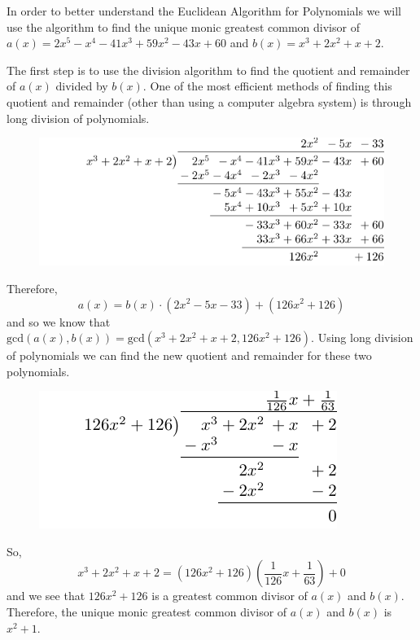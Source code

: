 \documentclass[
]{book}
\theoremstyle{definition}
\theoremstyle{definition}
\theoremstyle{definition}
\theoremstyle{remark}
\begin{document}
In order to better understand the Euclidean Algorithm for Polynomials we will use the algorithm to find the unique monic greatest common divisor of \(a(x)=2x^5-x^4-41x^3+59x^2-43x+60\) and \(b(x)=x^3+2x^2+x+2\).

The first step is to use the division algorithm to find the quotient and remainder of \(a(x)\) divided by \(b(x)\). One of the most efficient methods of finding this quotient and remainder (other than using a computer algebra system) is through long division of polynomials.

\begin{figure}

{\centering \includegraphics[width=0.75\linewidth]{tikz/polynomial-division} 

}

\end{figure}

Therefore,
\[a(x)=b(x) \cdot (2x^2-5x-33) + (126x^2 + 126)\] and so we know that \(\mathrm{gcd}(a(x),b(x))= \mathrm{gcd}(x^3+2x^2+x+2, 126x^2+126)\). Using long division of polynomials we can find the new quotient and remainder for these two polynomials.

\begin{figure}

{\centering \includegraphics[width=0.5\linewidth]{tikz/polynomial-division2} 

}

\end{figure}

So, \[x^3+2x^2+x+2 = (126x^2+126)\left(\frac{1}{126}x+\frac{1}{63}\right)+ 0\] and we see that \(126x^2+126\) is a greatest common divisor of \(a(x)\) and \(b(x)\). Therefore, the unique monic greatest common divisor of \(a(x)\) and \(b(x)\) is \(x^2+1\).
\end{document}
